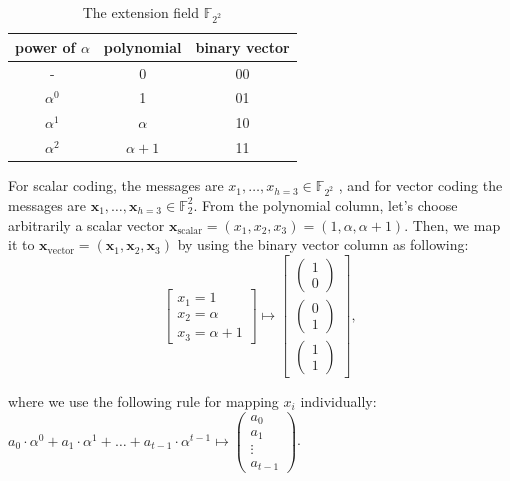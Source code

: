 \begin{center}
\begin{table}

\caption{The extension field $\ensuremath{\mathbb{F}}_{2^{2}}$}

\centering{}%
\begin{tabular}{|c|c|c|}
\hline 
power of $\alpha$ & polynomial & binary vector\tabularnewline
\hline 
- & 0 & 00\tabularnewline
\hline 
$\alpha^{0}$ & 1 & 01\tabularnewline
\hline 
$\alpha^{1}$ & $\alpha$ & 10\tabularnewline
\hline 
$\alpha^{2}$ & $\alpha+1$ & 11\tabularnewline
\hline 
\end{tabular}
\end{table}
For scalar coding, the messages are $x_{1},\ldots,x_{h=3}\in\ensuremath{\mathbb{F}}_{2^{2}}$
, and for vector coding the messages are $\boldsymbol{x}_{1},\ldots,\boldsymbol{x}_{h=3}\in\ensuremath{\mathbb{F}}_{2}^{2}$.
From the polynomial column, let's choose arbitrarily a scalar vector
$\boldsymbol{x}_{\mathrm{scalar}}=(x_{1},x_{2},x_{3})=(1,\alpha,\alpha+1)$.
Then, we map it to $\boldsymbol{x}_{\mathrm{vector}}=(\boldsymbol{x}_{1},\boldsymbol{x}_{2},\boldsymbol{x}_{3})$
by using the binary vector column as following:
\[
\left[\begin{array}{c}
x_{1}=1\\
x_{2}=\alpha\\
x_{3}=\alpha+1
\end{array}\right]\mapsto\left[\begin{array}{c}
\left(\begin{array}{c}
1\\
0
\end{array}\right)\\
\left(\begin{array}{c}
0\\
1
\end{array}\right)\\
\left(\begin{array}{c}
1\\
1
\end{array}\right)
\end{array}\right],
\]
\par\end{center}

where we use the following rule for mapping $x_{i}$ individually:
$a_{0}\cdot\alpha^{0}+a_{1}\cdot\alpha^{1}+\ldots+a_{t-1}\cdot\alpha^{t-1}\mapsto\left(\begin{array}{c}
a_{0}\\
a_{1}\\
\vdots\\
a_{t-1}
\end{array}\right)$.

